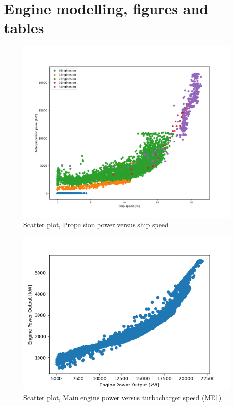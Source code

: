 \documentclass[preprint,12pt]{elsarticle}
\begin{document}
\appendix

\section{Engine modelling, figures and tables} \label{sec:appendix:engines}



\begin{figure}
	\centering
	\includegraphics[width=0.9\linewidth]{Figures/Pme_vs_vship_Neng}
	\caption{Scatter plot, Propulsion power versus ship speed}
	\label{fig:Pme_vs_vship_Neng}
\end{figure}

\begin{figure}
	\centering
	\includegraphics[width=0.9\linewidth]{Figures/Scatter_Pme_vs_TCspeed}
	\caption{Scatter plot, Main engine power versus turbocharger speed (ME1)}
	\label{fig:Pme_vs_TCspeed}
\end{figure}
\end{document}
